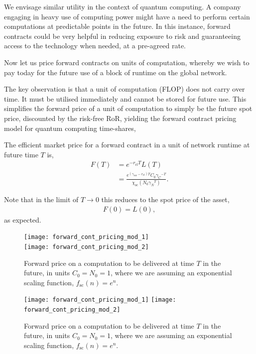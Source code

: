 We envisage similar utility in the context of quantum computing. A company engaging in heavy use of computing power might have a need to perform certain computations at predictable points in the future. In this instance, forward contracts could be very helpful in reducing exposure to risk and guaranteeing access to the technology when needed, at a pre-agreed rate.

Now let us price forward contracts on units of computation, whereby we wish to pay today for the future use of a block of runtime on the global network.

The key observation is that a unit of computation (FLOP) does not carry over time. It must be utilised immediately and cannot be stored for future use. This simplifies the forward price of a unit of computation to simply be the future spot price, discounted by the risk-free RoR, yielding the forward contract pricing model for quantum computing time-shares,
\begin{definition} \label{def:forward_cont}
The efficient market price for a forward contract in a unit of network runtime at future time $T$ is,
\begin{align}
F(T) &= e^{-r_\mathrm{rf}T} L(T)\nonumber\\
&=\frac{e^{(\gamma_\mathrm{ror}-r_\mathrm{rf})T} C_0{\gamma_C}^{-T}}{\chi_\mathrm{sc}(N_0 {\gamma_N}^T)}.
\end{align}
\end{definition}

Note that in the limit of \mbox{$T\to 0$} this reduces to the spot price of the asset,
\begin{align}
	F(0)=L(0),
\end{align}
as expected.

\pubmode
\begin{figure}[!htbp]
\texttt{[image: forward\_cont\_pricing\_mod\_1]}\\
\texttt{[image: forward\_cont\_pricing\_mod\_2]}
\captionspacefig \caption{Forward price on a computation to be delivered at time $T$ in the future, in units \mbox{$C_0=N_0=1$}, where we are assuming an exponential scaling function, \mbox{$f_\mathrm{sc}(n)=e^n$}.}\label{fig:forward_cont_pricing_mod}
\end{figure}
\else
\begin{figure}[!htbp]
\texttt{[image: forward\_cont\_pricing\_mod\_1]}
\texttt{[image: forward\_cont\_pricing\_mod\_2]}
\captionspacefig \caption{Forward price on a computation to be delivered at time $T$ in the future, in units \mbox{$C_0=N_0=1$}, where we are assuming an exponential scaling function, \mbox{$f_\mathrm{sc}(n)=e^n$}.}\label{fig:forward_cont_pricing_mod}
\end{figure}
\fi

